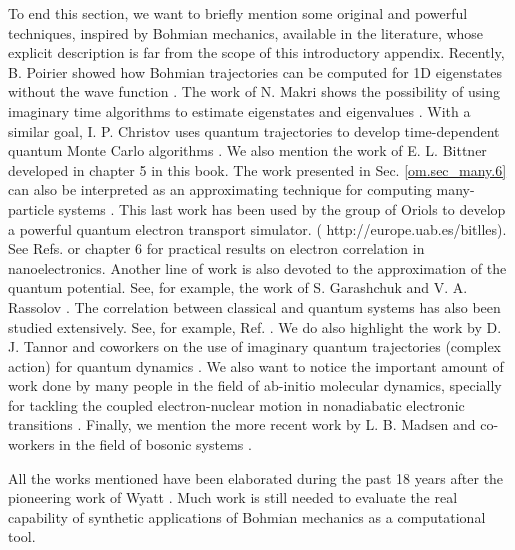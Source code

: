 \documentclass[nofootinbib, secnumarabic, amsmath, nobibnotes,10pt,aps,pra]{revtex4-1}
\newcommand{\sref}[1]{Sec. \ref{#1}}
\begin{document}
To end this section, we want to briefly mention some original and
powerful techniques, inspired by Bohmian mechanics, available in the
literature, whose explicit description is far from the scope of this
introductory appendix. Recently, B. Poirier showed how Bohmian
trajectories can be computed for 1D eigenstates without the wave
function \cite{om.poirier}. The work of N. Makri shows the possibility of using
imaginary time algorithms to estimate eigenstates and eigenvalues
\cite{om.imaginarytime}. With a similar goal, I. P. Christov uses
quantum trajectories to develop time-dependent quantum Monte Carlo
algorithms \cite{om.ivan,om.ivan2}. We also mention the work of E.
L. Bittner \cite{om.extra16} developed in chapter 5 in this book.
The work presented in \sref{om.sec_many.6} can also be interpreted as an
approximating technique for computing many-particle systems
\cite{om.oriolsprl}. This last work has been used by the group of
Oriols to develop a powerful quantum electron transport simulator. (
http://europe.uab.es/bitlles). See Refs.
\cite{om.oriolsexample1,om.oriolsexample2} or chapter 6 for
practical results on electron correlation in nanoelectronics.
Another line of work is also devoted to the approximation of the
quantum potential. See, for example, the work of S. Garashchuk and
V. A. Rassolov \cite{om.gara}. The correlation between classical and
quantum systems has also been studied extensively. See, for example,
Ref. \cite{om.extra13,om.5marian,om.6colomes}. We do also highlight the work by D. J.
Tannor and coworkers on the use of imaginary quantum trajectories
(complex action) for quantum dynamics
\cite{om.imaginaryaction,om.imaginaryactionprl}. We also want to notice the important amount of work done by many people in the field of ab-initio molecular dynamics, specially for tackling the coupled electron-nuclear motion in nonadiabatic electronic transitions \cite{om.extra18,om.extra19,om.extra20,om.extra21,om.extra22,om.extra23,om.extra24}. Finally, we mention the more recent work by L. B. Madsen and co-workers in the field of bosonic systems \cite{om.extra25}.


All the works mentioned have been elaborated during the past 18
years after the pioneering work of Wyatt
\cite{om.Wyatt1,om.extra17}. Much work is still needed to evaluate
the real capability of synthetic applications of Bohmian mechanics
as a computational tool.%
\end{document}
